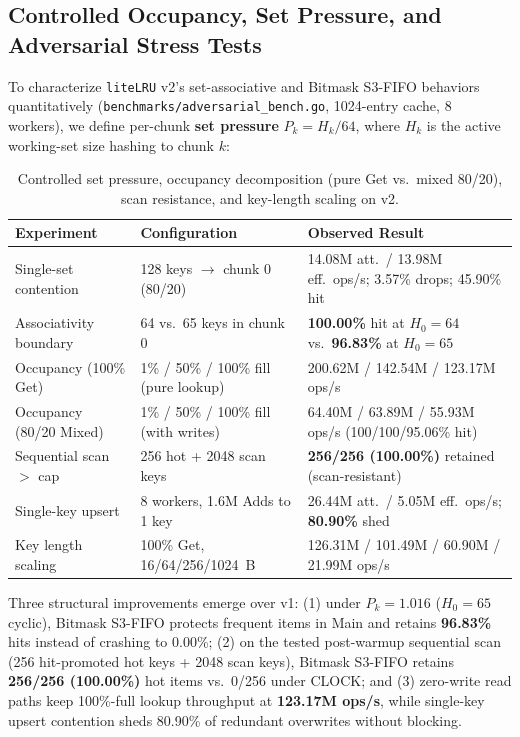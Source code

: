 \documentclass[11pt,a4paper]{article}
\begin{document}
\subsection{Controlled Occupancy, Set Pressure, and Adversarial Stress Tests}

To characterize \texttt{liteLRU} v2's set-associative and Bitmask S3-FIFO behaviors quantitatively (\texttt{benchmarks/adversarial\_bench.go}, 1024-entry cache, 8 workers), we define per-chunk \textbf{set pressure} $P_k = H_k / 64$, where $H_k$ is the active working-set size hashing to chunk $k$:

\begin{table}[h]
\centering
\begin{tabular}{@{}lll@{}}
\toprule
\textbf{Experiment} & \textbf{Configuration} & \textbf{Observed Result} \\ \midrule
Single-set contention & 128 keys $\to$ chunk 0 (80/20) & 14.08M att.\ / 13.98M eff.\ ops/s; 3.57\% drops; 45.90\% hit \\
Associativity boundary & 64 vs.\ 65 keys in chunk 0 & \textbf{100.00\%} hit at $H_0=64$ vs.\ \textbf{96.83\%} at $H_0=65$ \\
Occupancy (100\% Get) & 1\% / 50\% / 100\% fill (pure lookup) & 200.62M / 142.54M / 123.17M ops/s \\
Occupancy (80/20 Mixed) & 1\% / 50\% / 100\% fill (with writes) & 64.40M / 63.89M / 55.93M ops/s (100/100/95.06\% hit) \\
Sequential scan $>$ cap & 256 hot + 2048 scan keys & \textbf{256/256 (100.00\%)} retained (scan-resistant) \\
Single-key upsert & 8 workers, 1.6M Adds to 1 key & 26.44M att.\ / 5.05M eff.\ ops/s; \textbf{80.90\%} shed \\
Key length scaling & 100\% Get, 16/64/256/1024~B & 126.31M / 101.49M / 60.90M / 21.99M ops/s \\ \bottomrule
\end{tabular}
\caption{Controlled set pressure, occupancy decomposition (pure Get vs.\ mixed 80/20), scan resistance, and key-length scaling on v2.}
\end{table}

Three structural improvements emerge over v1: (1) under $P_k = 1.016$ ($H_0=65$ cyclic), Bitmask S3-FIFO protects frequent items in Main and retains \textbf{96.83\%} hits instead of crashing to 0.00\%; (2) on the tested post-warmup sequential scan (256 hit-promoted hot keys + 2048 scan keys), Bitmask S3-FIFO retains \textbf{256/256 (100.00\%)} hot items vs.\ 0/256 under CLOCK; and (3) zero-write read paths keep 100\%-full lookup throughput at \textbf{123.17M ops/s}, while single-key upsert contention sheds 80.90\% of redundant overwrites without blocking.
\end{document}
